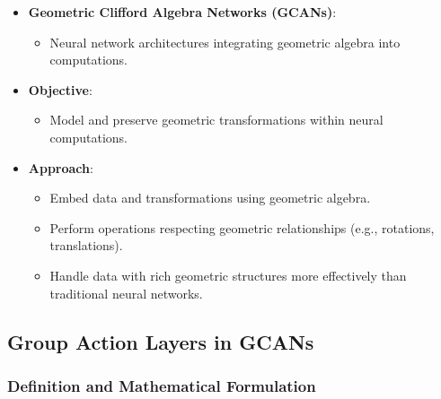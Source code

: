 \documentclass[a4paper,14pt]{article}
\theoremstyle{plain} %
\theoremstyle{definition} %
\theoremstyle{remark} %
\theoremstyle{definition}
\theoremstyle{remark}
\theoremstyle{remark}
\begin{document}
	\begin{itemize}
		\item \textbf{Geometric Clifford Algebra Networks (GCANs)}:
		\begin{itemize}
			\item Neural network architectures integrating geometric algebra into computations.
		\end{itemize}
		\item \textbf{Objective}:
		\begin{itemize}
			\item Model and preserve geometric transformations within neural computations.
		\end{itemize}
		\item \textbf{Approach}:
		\begin{itemize}
			\item Embed data and transformations using geometric algebra.
			\item Perform operations respecting geometric relationships (e.g., rotations, translations).
			\item Handle data with rich geometric structures more effectively than traditional neural networks.
		\end{itemize}
	\end{itemize}
	
	\subsection{Group Action Layers in GCANs}
	
	\subsubsection{Definition and Mathematical Formulation}
	
\end{document}
